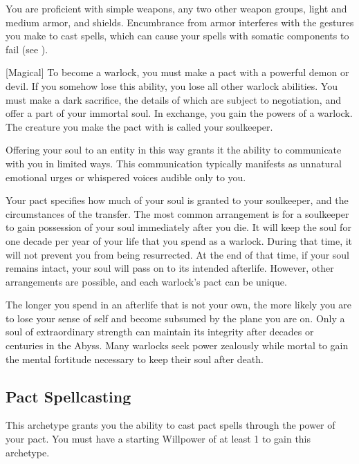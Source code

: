         You are proficient with simple weapons, any two other weapon groups, light and medium armor, and shields.
        Encumbrance from armor interferes with the gestures you make to cast spells, which can cause your spells with somatic components to fail (see ).

        [Magical]
        To become a warlock, you must make a pact with a powerful demon or devil.
        If you somehow lose this ability, you lose all other warlock abilities.
        You must make a dark sacrifice, the details of which are subject to negotiation, and offer a part of your immortal soul.
        In exchange, you gain the powers of a warlock.
        The creature you make the pact with is called your soulkeeper.

        Offering your soul to an entity in this way grants it the ability to communicate with you in limited ways.
        This communication typically manifests as unnatural emotional urges or whispered voices audible only to you.

        Your pact specifies how much of your soul is granted to your soulkeeper, and the circumstances of the transfer.
        The most common arrangement is for a soulkeeper to gain possession of your soul immediately after you die.
        It will keep the soul for one decade per year of your life that you spend as a warlock.
        During that time, it will not prevent you from being resurrected.
        At the end of that time, if your soul remains intact, your soul will pass on to its intended afterlife.
        However, other arrangements are possible, and each warlock's pact can be unique.

        The longer you spend in an afterlife that is not your own, the more likely you are to lose your sense of self and become subsumed by the plane you are on.
        Only a soul of extraordinary strength can maintain its integrity after decades or centuries in the Abyss.
        Many warlocks seek power zealously while mortal to gain the mental fortitude necessary to keep their soul after death.

    \subsection{Pact Spellcasting}
        This archetype grants you the ability to cast pact spells through the power of your pact.
        You must have a starting Willpower of at least 1 to gain this archetype.


